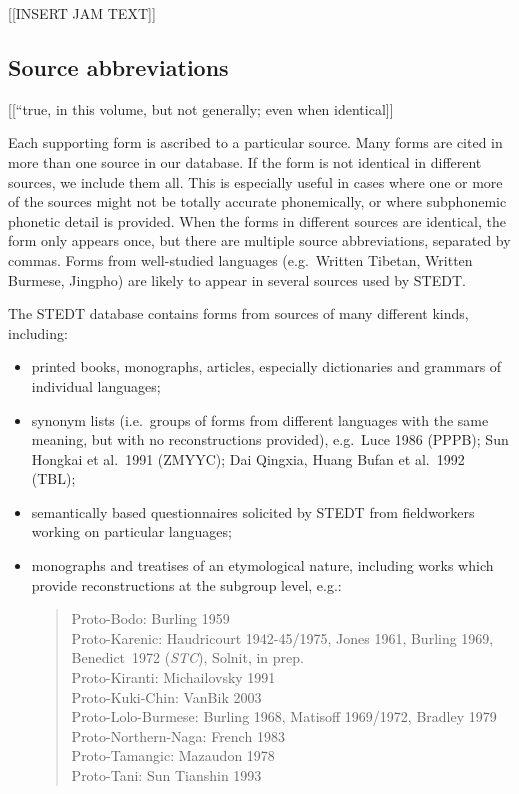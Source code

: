 [[INSERT JAM TEXT]]

\subsection{Source abbreviations}

[[``true, in this volume, but not generally; even when identical]]

Each supporting form is ascribed to a particular source.  Many forms are
cited in more than one source in our database.  If the form is not identical in
different sources, we include them all.  This is especially useful in cases
where one or more of the sources might not be totally accurate phonemically, or
where subphonemic phonetic detail is provided. When the forms in different
sources are identical, the form only appears once, but there are multiple source
abbreviations, separated by commas.  Forms from well-studied languages
(e.g.\ Written Tibetan, Written Burmese, Jingpho) are likely to appear in several
sources used by STEDT.


The STEDT database contains forms from sources of many different kinds,
including:
\begin{itemize}
\item printed books, monographs, articles, especially dictionaries and grammars of
individual languages;
\item synonym lists (i.e.\ groups of forms from different languages with the same
meaning, but with no reconstructions provided), e.g.\ Luce 1986 (PPPB); Sun
Hongkai et al.\ 1991 (ZMYYC); Dai Qingxia, Huang Bufan et al.\ 1992 (TBL);
\item semantically based questionnaires solicited by STEDT from fieldworkers working
on particular languages;
\item monographs and treatises of an etymological nature, including works which
provide reconstructions at the subgroup level, e.g.:

\begin{verse}
Proto-Bodo: Burling 1959\\
Proto-Karenic: Haudricourt 1942-45/1975, Jones 1961, Burling 1969, Benedict~1972 (\textit{STC}), Solnit, in prep.\\
Proto-Kiranti: Michailovsky 1991\\
Proto-Kuki-Chin: VanBik 2003\\
Proto-Lolo-Burmese: Burling 1968, Matisoff 1969/1972, Bradley 1979\\
Proto-Northern-Naga: French 1983\\
Proto-Tamangic: Mazaudon 1978\\
Proto-Tani: Sun Tianshin 1993\\
\end{verse}
\end{itemize}


